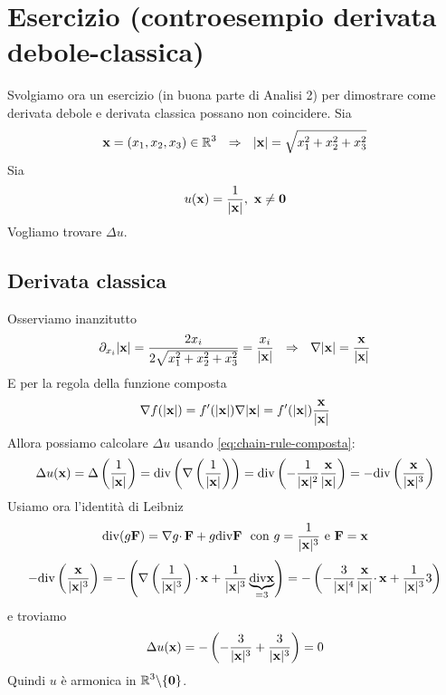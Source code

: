 \section{Esercizio (controesempio derivata debole-classica)}
\label{sec:controesempio-derivata-debole-classica}

Svolgiamo ora un esercizio (in buona parte di Analisi 2) per dimostrare come derivata debole e derivata classica possano non coincidere. Sia
\begin{equation*}
    \mathbf{x} =(x_{1} ,x_{2} ,x_{3}) \in \mathbb{R}^{3} \ \ \Rightarrow \ \ | \mathbf{x}| =\sqrt{x^{2}_{1} +x^{2}_{2} +x^{2}_{3}}
\end{equation*}
Sia
\begin{equation*}
    u(\mathbf{x}) =\frac{1}{| \mathbf{x}| } ,\ \mathbf{x} \neq \mathbf{0}
\end{equation*}
Vogliamo trovare $\displaystyle \Delta u$.

\subsection{Derivata classica}

Osserviamo inanzitutto
\begin{equation*}
    \partial _{x_{i}}| \mathbf{x}| =\frac{2x_{i}}{2\sqrt{x_{1}^{2} +x_{2}^{2} +x_{3}^{2}}} =\frac{x_{i}}{|\mathbf{x}| } \ \ \Rightarrow \ \ \nabla | \mathbf{x}| =\frac{\mathbf{x}}{| \mathbf{x}| }
\end{equation*}
E per la regola della funzione composta
\begin{equation}
    \nabla f(| \mathbf{x}|) =f'(| \mathbf{x}|) \nabla | \mathbf{x}| =f'(| \mathbf{x}|)\frac{\mathbf{x}}{| \mathbf{x}| }
    \label{eq:chain-rule-composta}
\end{equation}
Allora possiamo calcolare $\displaystyle \Delta u$ usando \eqref{eq:chain-rule-composta}:
\begin{equation*}
    \Delta u(\mathbf{x}) =\Delta \left(\frac{1}{| \mathbf{x}| }\right) =\mathrm{div}\left(\nabla \left(\frac{1}{| \mathbf{x}| }\right)\right) =\mathrm{div}\left(-\frac{1}{| \mathbf{x}| ^{2}}\frac{\mathbf{x}}{| \mathbf{x}| }\right) =-\mathrm{div}\left(\frac{\mathbf{x}}{| \mathbf{x}| ^{3}}\right)
\end{equation*}
Usiamo ora l'identità di Leibniz
\begin{equation*}
    \mathrm{div}(g\mathbf{F}) =\nabla g\cdotp \mathbf{F} +g\mathrm{div}\mathbf{F} \ \ \text{con} \ g=\frac{1}{| \mathbf{x}| ^{3}} \ \text{e} \ \mathbf{F} =\mathbf{x}
\end{equation*}
\begin{equation*}
    -\mathrm{div}\left(\frac{\mathbf{x}}{| \mathbf{x}| ^{3}}\right) =-\left(\nabla \left(\frac{1}{| \mathbf{x}| ^{3}}\right) \cdotp \mathbf{x} +\frac{1}{| \mathbf{x}| ^{3}}\underbrace{\mathrm{div}\mathbf{x}}_{=3}\right) =-\left(-\frac{3}{| \mathbf{x}| ^{4}}\frac{\mathbf{x}}{| \mathbf{x}| } \cdotp \mathbf{x} +\frac{1}{| \mathbf{x}| ^{3}} 3\right)
\end{equation*}
e troviamo
\begin{equation*}
    \Delta u(\mathbf{x}) =-\left(-\frac{3}{| \mathbf{x}| ^{3}} +\frac{3}{| \mathbf{x}| ^{3}}\right) =0
\end{equation*}
Quindi $u$ è armonica in $\displaystyle \mathbb{R}^{3} \backslash \{\mathbf{0}\}$.

